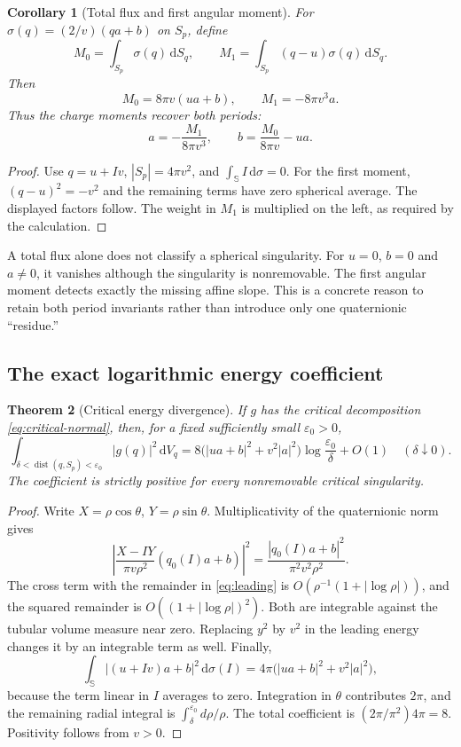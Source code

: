 \documentclass[11pt,a4paper]{article}
\numberwithin{equation}{section}
\newtheorem{theorem}{Theorem}[section]
\newtheorem{corollary}[theorem]{Corollary}
\theoremstyle{definition}
\theoremstyle{remark}
\newcommand{\SSS}{\mathbb S}
\newcommand{\dd}{\,\mathrm d}
\DeclareMathOperator{\dist}{dist}
\begin{document}
\begin{corollary}[Total flux and first angular moment]\label{cor:moments}
For $\sigma(q)=(2/v)(qa+b)$ on $S_p$, define
\[
 M_0=\int_{S_p}\sigma(q)\dd S_q,\qquad
 M_1=\int_{S_p}(q-u)\sigma(q)\dd S_q.
\]
Then
\begin{equation}\label{eq:moments}
 M_0=8\pi v(ua+b),\qquad M_1=-8\pi v^3a.
\end{equation}
Thus the charge moments recover both periods:
\begin{equation}\label{eq:moment-inversion}
 a=-\frac{M_1}{8\pi v^3},\qquad
 b=\frac{M_0}{8\pi v}-ua.
\end{equation}
\end{corollary}
\begin{proof}
Use $q=u+Iv$, $|S_p|=4\pi v^2$, and $\int_{\SSS}I\dd\sigma=0$.
For the first moment, $(q-u)^2=-v^2$ and the remaining terms have zero spherical
average. The displayed factors follow. The weight in $M_1$ is multiplied on
the left, as required by the calculation.
\end{proof}

A total flux alone does not classify a spherical singularity. For $u=0$, $b=0$
and $a\ne0$, it vanishes although the singularity is nonremovable. The first
angular moment detects exactly the missing affine slope. This is a concrete
reason to retain both period invariants rather than introduce only one
quaternionic ``residue.''

\subsection{The exact logarithmic energy coefficient}
\begin{theorem}[Critical energy divergence]\label{thm:energy}
If $g$ has the critical decomposition \eqref{eq:critical-normal}, then, for a
fixed sufficiently small $\varepsilon_0>0$,
\begin{equation}\label{eq:energy}
 \int_{\delta<\dist(q,S_p)<\varepsilon_0}|g(q)|^2\dd V_q
 =8\bigl(|ua+b|^2+v^2|a|^2\bigr)
          \log\frac{\varepsilon_0}{\delta}+O(1)
 \quad(\delta\downarrow0).
\end{equation}
The coefficient is strictly positive for every nonremovable critical
singularity.
\end{theorem}
\begin{proof}
Write $X=\rho\cos\theta$, $Y=\rho\sin\theta$. Multiplicativity of the
quaternionic norm gives
\[
 \left|\frac{X-IY}{\pi v\rho^2}(q_0(I)a+b)\right|^2
     =\frac{|q_0(I)a+b|^2}{\pi^2v^2\rho^2}.
\]
The cross term with the remainder in \eqref{eq:leading} is
$O(\rho^{-1}(1+|\log\rho|))$, and the squared remainder is
$O((1+|\log\rho|)^2)$. Both are integrable against the tubular volume measure
near zero. Replacing $y^2$ by $v^2$ in the leading energy changes it by an
integrable term as well. Finally,
\[
 \int_{\SSS}|(u+Iv)a+b|^2\dd\sigma(I)
       =4\pi\bigl(|ua+b|^2+v^2|a|^2\bigr),
\]
because the term linear in $I$ averages to zero. Integration in $\theta$
contributes $2\pi$, and the remaining radial integral is
$\int_\delta^{\varepsilon_0}d\rho/\rho$. The total coefficient is
$(2\pi/\pi^2)4\pi=8$. Positivity follows from $v>0$.
\end{proof}
\end{document}
